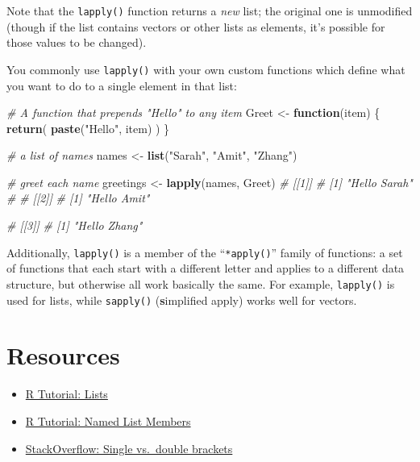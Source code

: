 \documentclass[]{book}
\newenvironment{Shaded}{\begin{snugshade}}{\end{snugshade}}
\newcommand{\KeywordTok}[1]{\textcolor[rgb]{0.13,0.29,0.53}{\textbf{#1}}}
\newcommand{\StringTok}[1]{\textcolor[rgb]{0.31,0.60,0.02}{#1}}
\newcommand{\CommentTok}[1]{\textcolor[rgb]{0.56,0.35,0.01}{\textit{#1}}}
\newcommand{\ControlFlowTok}[1]{\textcolor[rgb]{0.13,0.29,0.53}{\textbf{#1}}}
\newcommand{\NormalTok}[1]{#1}
\providecommand{\tightlist}{%
  \setlength{\itemsep}{0pt}\setlength{\parskip}{0pt}}
\theoremstyle{definition}
\theoremstyle{definition}
\theoremstyle{remark}
\begin{document}
Note that the \texttt{lapply()} function returns a \emph{new} list; the
original one is unmodified (though if the list contains vectors or other
lists as elements, it's possible for those values to be changed).

You commonly use \texttt{lapply()} with your own custom functions which
define what you want to do to a single element in that list:

\begin{Shaded}
\begin{Highlighting}[]
\CommentTok{# A function that prepends "Hello" to any item}
\NormalTok{Greet <-}\StringTok{ }\ControlFlowTok{function}\NormalTok{(item) \{}
  \KeywordTok{return}\NormalTok{( }\KeywordTok{paste}\NormalTok{(}\StringTok{"Hello"}\NormalTok{, item) )}
\NormalTok{\}}

\CommentTok{# a list of names}
\NormalTok{names <-}\StringTok{ }\KeywordTok{list}\NormalTok{(}\StringTok{"Sarah"}\NormalTok{, }\StringTok{"Amit"}\NormalTok{, }\StringTok{"Zhang"}\NormalTok{)}

\CommentTok{# greet each name}
\NormalTok{greetings <-}\StringTok{ }\KeywordTok{lapply}\NormalTok{(names, Greet)}
            \CommentTok{# [[1]]}
            \CommentTok{# [1] "Hello Sarah"}
            \CommentTok{#}
            \CommentTok{# [[2]]}
            \CommentTok{# [1] "Hello Amit"}

            \CommentTok{# [[3]]}
            \CommentTok{# [1] "Hello Zhang"}
\end{Highlighting}
\end{Shaded}

Additionally, \texttt{lapply()} is a member of the ``\texttt{*apply()}''
family of functions: a set of functions that each start with a different
letter and applies to a different data structure, but otherwise all work
basically the same. For example, \texttt{lapply()} is used for lists,
while \texttt{sapply()} (\textbf{s}implified apply) works well for
vectors.

\section*{Resources}\label{resources-7}


\begin{itemize}
\tightlist
\item
  \href{http://www.r-tutor.com/r-introduction/list}{R Tutorial: Lists}
\item
  \href{http://www.r-tutor.com/r-introduction/list/named-list-members}{R
  Tutorial: Named List Members}
\item
  \href{http://stackoverflow.com/questions/1169456/in-r-what-is-the-difference-between-the-and-notations-for-accessing-the}{StackOverflow:
  Single vs.~double brackets}
\end{itemize}
\end{document}
